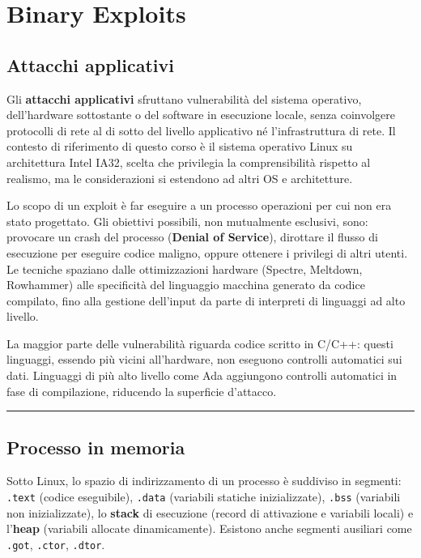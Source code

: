 \documentclass[12pt, a4paper]{report}
\begin{document}
\chapter{Binary Exploits}

\section{Attacchi applicativi}

Gli \textbf{attacchi applicativi} sfruttano vulnerabilità del sistema operativo, dell'hardware sottostante o del software in esecuzione locale, senza coinvolgere protocolli di rete al di sotto del livello applicativo né l'infrastruttura di rete. Il contesto di riferimento di questo corso è il sistema operativo Linux su architettura Intel IA32, scelta che privilegia la comprensibilità rispetto al realismo, ma le considerazioni si estendono ad altri OS e architetture.

Lo scopo di un exploit è far eseguire a un processo operazioni per cui non era stato progettato. Gli obiettivi possibili, non mutualmente esclusivi, sono: provocare un crash del processo (\textbf{Denial of Service}), dirottare il flusso di esecuzione per eseguire codice maligno, oppure ottenere i privilegi di altri utenti. Le tecniche spaziano dalle ottimizzazioni hardware (Spectre, Meltdown, Rowhammer) alle specificità del linguaggio macchina generato da codice compilato, fino alla gestione dell'input da parte di interpreti di linguaggi ad alto livello.

La maggior parte delle vulnerabilità riguarda codice scritto in C/C++: questi linguaggi, essendo più vicini all'hardware, non eseguono controlli automatici sui dati. Linguaggi di più alto livello come Ada aggiungono controlli automatici in fase di compilazione, riducendo la superficie d'attacco.

\noindent\rule{\textwidth}{0.4pt}

\section{Processo in memoria}

Sotto Linux, lo spazio di indirizzamento di un processo è suddiviso in segmenti: \texttt{.text} (codice eseguibile), \texttt{.data} (variabili statiche inizializzate), \texttt{.bss} (variabili non inizializzate), lo \textbf{stack} di esecuzione (record di attivazione e variabili locali) e l'\textbf{heap} (variabili allocate dinamicamente). Esistono anche segmenti ausiliari come \texttt{.got}, \texttt{.ctor}, \texttt{.dtor}.
\end{document}
